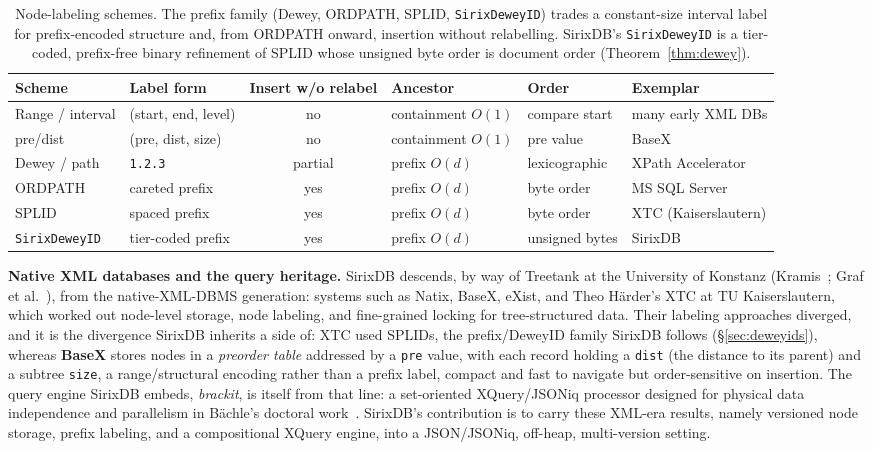 \documentclass[11pt,a4paper,oneside]{report}
\theoremstyle{sirixthm}
\newcommand{\code}[1]{\texttt{#1}}
\begin{document}
\begin{table}[h]
\centering\footnotesize\setlength{\tabcolsep}{4pt}\renewcommand{\arraystretch}{1.25}
\begin{tabularx}{\linewidth}{@{}l l c l l X@{}}
\toprule
\textbf{Scheme} & \textbf{Label form} & \textbf{Insert w/o relabel} & \textbf{Ancestor} & \textbf{Order} & \textbf{Exemplar}\\
\midrule
Range / interval & (start, end, level) & no & containment $O(1)$ & compare start & many early XML DBs\\
pre/dist & (pre, dist, size) & no & containment $O(1)$ & pre value & BaseX\\
Dewey / path & \code{1.2.3} & partial & prefix $O(d)$ & lexicographic & XPath Accelerator\\
ORDPATH & careted prefix & yes & prefix $O(d)$ & byte order & MS SQL Server\\
SPLID & spaced prefix & yes & prefix $O(d)$ & byte order & XTC (Kaiserslautern)\\
\code{SirixDeweyID} & tier-coded prefix & yes & prefix $O(d)$ & unsigned bytes & SirixDB\\
\bottomrule
\end{tabularx}
\caption{Node-labeling schemes. The prefix family (Dewey, ORDPATH, SPLID, \code{SirixDeweyID}) trades a
constant-size interval label for prefix-encoded structure and, from ORDPATH onward, insertion without
relabelling. SirixDB's \code{SirixDeweyID} is a tier-coded, prefix-free binary refinement of SPLID whose
unsigned byte order is document order (Theorem~\ref{thm:dewey}).}
\label{tab:labeling}
\end{table}

\textbf{Native XML databases and the query heritage.} SirixDB descends, by way of Treetank at the
University of Konstanz (Kramis~\cite{kramis}; Graf et al.~\cite{treetank,graf}), from the
native-XML-DBMS generation: systems such as Natix, BaseX, eXist, and Theo H\"arder's XTC at TU
Kaiserslautern, which worked out node-level storage, node labeling, and fine-grained locking for
tree-structured data. Their labeling approaches diverged, and it is the divergence SirixDB inherits a
side of: XTC used SPLIDs, the prefix/DeweyID family SirixDB follows (\S\ref{sec:deweyids}), whereas
\textbf{BaseX} stores nodes in a \emph{preorder table} addressed by a \code{pre} value, with each record
holding a \code{dist} (the distance to its parent) and a subtree \code{size}, a range/structural
encoding rather than a prefix label, compact and fast to navigate but order-sensitive on insertion. The
query engine SirixDB embeds, \emph{brackit}, is itself from that line: a
set-oriented XQuery/JSONiq processor designed for physical data independence and parallelism in
B\"achle's doctoral work~\cite{baechle}. SirixDB's contribution is to carry these XML-era results, namely
versioned node storage, prefix labeling, and a compositional XQuery engine, into a JSON/JSONiq,
off-heap, multi-version setting.
\end{document}
